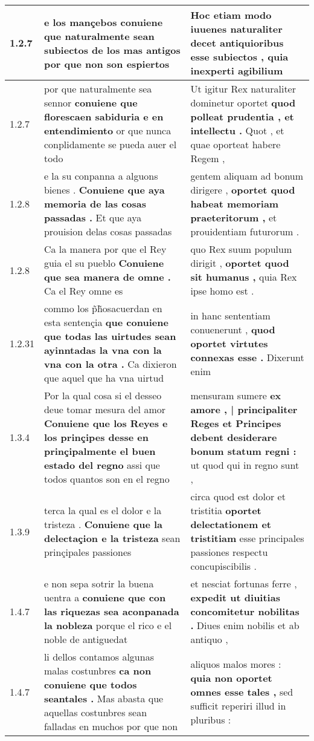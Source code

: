 \begin{tabular}{|p{1cm}|p{6.5cm}|p{6.5cm}|}
1.2.7 & e los mançebos \textbf{ conuiene que naturalmente sean subiectos de los mas antigos } por que non son espiertos & Hoc etiam modo iuuenes naturaliter decet \textbf{ antiquioribus esse subiectos , } quia inexperti agibilium \\\hline
1.2.7 & por que naturalmente sea sennor \textbf{ conuiene que florescaen sabiduria e en entendimiento } or que nunca conplidamente se pueda auer el todo & Ut igitur Rex naturaliter dominetur oportet \textbf{ quod polleat prudentia , et intellectu . } Quot , et quae oporteat habere Regem , \\\hline
1.2.8 & e la su conpanna a alguons bienes . \textbf{ Conuiene que aya memoria de las cosas passadas . } Et que aya prouision delas cosas passadas & gentem aliquam ad bonum dirigere , \textbf{ oportet quod habeat memoriam praeteritorum , } et prouidentiam futurorum . \\\hline
1.2.8 & Ca la manera por que el Rey guia el su pueblo \textbf{ Conuiene que sea manera de omne . } Ca el Rey omne es & quo Rex suum populum dirigit , \textbf{ oportet quod sit humanus , } quia Rex ipse homo est . \\\hline
1.2.31 & commo los p̃h̃osacuerdan en esta sentençia \textbf{ que conuiene que todas las uirtudes sean ayinntadas la vna con la vna con la otra . } Ca dixieron que aquel que ha vna uirtud & in hanc sententiam conuenerunt , \textbf{ quod oportet virtutes connexas esse . } Dixerunt enim \\\hline
1.3.4 & Por la qual cosa si el desseo deue tomar mesura del amor \textbf{ Conuiene que los Reyes e los prinçipes desse en prinçipalmente el buen estado del regno } assi que todos quantos son en el regno & mensuram sumere \textbf{ ex amore , | principaliter Reges et Principes debent desiderare bonum statum regni : } ut quod qui in regno sunt , \\\hline
1.3.9 & terca la qual es el dolor e la tristeza . \textbf{ Conuiene que la delectaçion e la tristeza } sean prinçipales passiones & circa quod est dolor et tristitia \textbf{ oportet delectationem et tristitiam } esse principales passiones respectu concupiscibilis . \\\hline
1.4.7 & e non sepa sotrir la buena uentra a \textbf{ conuiene que con las riquezas sea aconpanada la nobleza } porque el rico e el noble de antiguedat & et nesciat fortunas ferre , \textbf{ expedit ut diuitias concomitetur nobilitas . } Diues enim nobilis et ab antiquo , \\\hline
1.4.7 & li dellos contamos algunas malas costunbres \textbf{ ca non conuiene que todos seantales . } Mas abasta que aquellas costunbres sean falladas en muchos por que non & aliquos malos mores : \textbf{ quia non oportet omnes esse tales , } sed sufficit reperiri illud in pluribus : \\\hline

\end{tabular}
